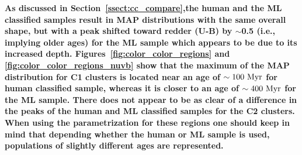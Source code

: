 \documentclass[linenumbers]{aastex63}
\begin{document}
\textbf{As discussed in Section~\ref{ssect:cc_compare},the human and the ML classified samples result in MAP distributions with the same overall shape, but with a peak shifted toward redder (U-B) by $\sim$0.5 (i.e., implying older ages) for the ML sample which appears to be due to its increased depth. Figures~\ref{fig:color_color_regions} and \ref{fig:color_color_regions_nuvb} show that the maximum of the MAP distribution for C1 clusters is located near an age of ${\rm \sim 100~Myr}$ for human classified sample, whereas it is closer to an age of ${\rm \sim 400~Myr}$ for the ML sample.  There does not appear to be as clear of a difference in the peaks of the human and ML classified samples for the C2 clusters.  When using the parametrization for these regions  one should keep in mind that depending whether the human or ML sample is used, populations of slightly different ages are represented.}




\end{document}
